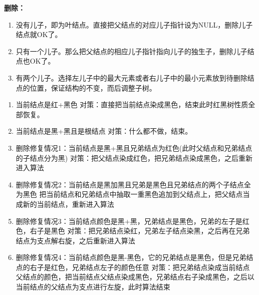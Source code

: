 \textbf{删除：}
\begin{enumerate}
    \item 没有儿子，即为叶结点。直接把父结点的对应儿子指针设为NULL，删除儿子结点就OK了。
    \item 只有一个儿子。那么把父结点的相应儿子指针指向儿子的独生子，删除儿子结点也OK了。
    \item 有两个儿子。选择左儿子中的最大元素或者右儿子中的最小元素放到待删除结点的位置，保证结构的不变，而后调整子树。
\end{enumerate}

\begin{enumerate}
    \item 当前结点是红+黑色
    \subitem 对策：直接把当前结点染成黑色，结束此时红黑树性质全部恢复。
    \item 当前结点是黑+黑且是根结点
    \subitem 对策：什么都不做，结束。
    \item 删除修复情况1：当前结点是黑+黑且兄弟结点为红色(此时父结点和兄弟结点的子结点分为黑)
    \subitem 对策：把父结点染成红色，把兄弟结点染成黑色，之后重新进入算法
    \item 删除修复情况2：当前结点是黑加黑且兄弟是黑色且兄弟结点的两个子结点全为黑色
    \subitem 把当前结点和兄弟结点中抽取一重黑色追加到父结点上，把父结点当成新的当前结点，重新进入算法
    \item 删除修复情况3：当前结点颜色是黑+黑，兄弟结点是黑色，兄弟的左子是红色，右子是黑色
    \subitem 对策：把兄弟结点染红，兄弟左子结点染黑，之后再在兄弟结点为支点解右旋，之后重新进入算法
    \item 删除修复情况4：当前结点颜色是黑-黑色，它的兄弟结点是黑色，但是兄弟结点的右子是红色，兄弟结点左子的颜色任意
    \subitem 对策：把兄弟结点染成当前结点父结点的颜色，把当前结点父结点染成黑色，兄弟结点右子染成黑色，之后以当前结点的父结点为支点进行左旋，此时算法结束
\end{enumerate}




